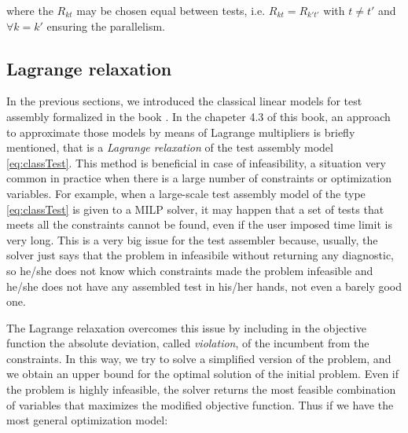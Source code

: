 where the $R_{kt}$ may be chosen equal between tests, i.e. $R_{kt}=R_{k't'}$ with $t \ne t'$ and $\forall k=k'$ ensuring the parallelism.

\subsection{Lagrange relaxation}\label{sec:lagrange}

In the previous sections, we introduced the classical linear models for test assembly formalized in the book \textcite{VDL2005}. In the chapeter 4.3 of this book, an approach to approximate those models by means of Lagrange multipliers is briefly mentioned, that is a \emph{Lagrange relaxation} of the test assembly model \eqref{eq:classTest}.
This method is beneficial in case of infeasibility, a situation very common in practice when there is a large number of constraints or optimization variables. For example, when a large-scale test assembly model of the type \eqref{eq:classTest} is given to a MILP solver, it may happen that a set of tests that meets all the constraints cannot be found, even if the user imposed time limit is very long. This is a very big issue for the test assembler because, usually, the solver just says that the problem in infeasibile without returning any diagnostic, so he/she does not know which constraints made the problem infeasible and he/she does not have any assembled test in his/her hands, not even a barely good one. 

The Lagrange relaxation \parencite{fisher1981lagrangian} overcomes this issue by including in the objective function the absolute deviation, called \emph{violation}, of the incumbent from the constraints. In this way, we try to solve a simplified version of the problem, and we obtain an upper bound for the optimal solution of the initial problem. Even if the problem is highly infeasible, the solver returns the most feasible combination of variables that maximizes the modified objective function.
Thus if we have the most general optimization model:

